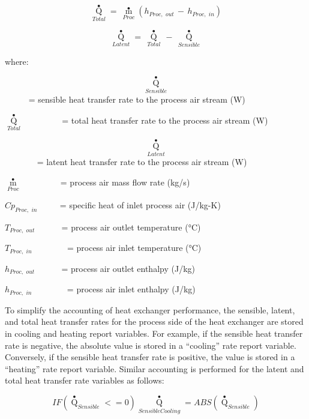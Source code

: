 \begin{equation}
{\mathop Q\limits^ \bullet_{Total}} = \,{\mathop m\limits^ \bullet_{Proc}}\left( {{h_{Proc,\,\,out}}\, - \,{h_{Proc,\,\,in}}} \right)
\end{equation}

\begin{equation}
{\mathop Q\limits^ \bullet_{Latent}} = \,{\mathop Q\limits^ \bullet_{Total}}\, - \,{\mathop Q\limits^ \bullet_{Sensible}}
\end{equation}

where:

\[{\mathop Q\limits^ \bullet_{Sensible}}\] ~~~~~ = sensible heat transfer rate to the process air stream (W)

\({\mathop Q\limits^ \bullet_{Total}}\) ~~~~~~~~ = total heat transfer rate to the process air stream (W)

\[{\mathop Q\limits^ \bullet_{Latent}}\] ~~~~~~~ = latent heat transfer rate to the process air stream (W)

\({\mathop m\limits^ \bullet_{Proc}}\) ~~~~~~~~ = process air mass flow rate (kg/s)

\(C{p_{Proc,\,\,in}}\) ~~~~ = specific heat of inlet process air (J/kg-K)

\({T_{Proc,\,\,out}}\) ~~~~~ = process air outlet temperature (°C)

\({T_{Proc,\,\,in}}\) ~~~~~~~ = process air inlet temperature (°C)

\({h_{Proc,\,\,out}}\) ~~~~~ = process air outlet enthalpy (J/kg)

\({h_{Proc,\,\,in}}\) ~~~~~~~ = process air inlet enthalpy (J/kg)

To simplify the accounting of heat exchanger performance, the sensible, latent, and total heat transfer rates for the process side of the heat exchanger are stored in cooling and heating report variables. For example, if the sensible heat transfer rate is negative, the absolute value is stored in a ``cooling'' rate report variable. Conversely, if the sensible heat transfer rate is positive, the value is stored in a ``heating'' rate report variable. Similar accounting is performed for the latent and total heat transfer rate variables as follows:

\begin{equation}
IF\left( {{{\mathop Q\limits^ \bullet  }_{Sensible}} <  = 0} \right){\mathop Q\limits^ \bullet_{SensibleCooling}} = ABS\left( {{{\mathop Q\limits^ \bullet  }_{Sensible}}} \right)
\end{equation}

